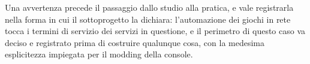 Una avvertenza precede il passaggio dallo studio alla pratica, e vale registrarla nella forma in cui il sottoprogetto la dichiara: l'automazione dei giochi in rete tocca i termini di servizio dei servizi in questione, e il perimetro di questo caso va deciso e registrato prima di costruire qualunque cosa, con la medesima esplicitezza impiegata per il modding della console.
